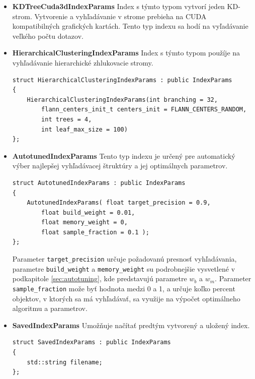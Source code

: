 \documentclass[12pt,oneside]{fithesis2}
\begin{document}
\begin{itemize}
\item \textbf{KDTreeCuda3dIndexParams} Index s týmto typom vytvorí jeden KD-strom. Vytvorenie a vyhľadávanie v strome prebieha na CUDA kompatibilných grafických kartách. Tento typ indexu sa hodí na vyľadávanie veľkého počtu dotazov. \cite{manual}

\item \textbf{HierarchicalClusteringIndexParams} Index s týmto typom použíje na vyhľadávanie hierarchické zhlukovacie stromy. \cite{manual}
{\scriptsize
\begin{lstlisting}
struct HierarchicalClusteringIndexParams : public IndexParams
{
	HierarchicalClusteringIndexParams(int branching = 32,
		flann_centers_init_t centers_init = FLANN_CENTERS_RANDOM,
		int trees = 4, 
		int leaf_max_size = 100)
};
\end{lstlisting}}
\item \textbf{AutotunedIndexParams} Tento typ indexu je určený pre automatický výber najlepšej vyhľadávacej štruktúry a jej optimálnych parametrov. \cite{manual}
{\scriptsize
\begin{lstlisting}
struct AutotunedIndexParams : public IndexParams
{
	AutotunedIndexParams( float target_precision = 0.9,
		float build_weight = 0.01,
		float memory_weight = 0,
		float sample_fraction = 0.1 );
};
\end{lstlisting}}
Parameter \texttt{target\_precision} určuje požadovanú presnosť vyhľadávania, parametre \texttt{build\_weight} a \texttt{memory\_weight} su podrobnejšie vysvetlené v podkapitole \ref{sec:autotuning}, kde predstavujú parametre $w_b$ a $w_m$. Parameter \texttt{sample\_fraction} može byť hodnota medzi 0 a 1, a určuje koľko percent objektov, v ktorých sa má vyhľadávať, sa využije na výpočet optimálneho algoritmu a parametrov. \cite{manual}

\item \textbf{SavedIndexParams} Umožňuje načítať predtým vytvorený a uložený index. \cite{manual}
{\scriptsize
\begin{lstlisting}
struct SavedIndexParams : public IndexParams
{
	std::string filename;
};
\end{lstlisting}}
\end{itemize}
\end{document}
